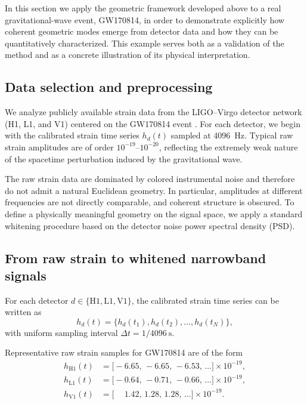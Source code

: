 \documentclass[11pt,a4paper]{article}
\begin{document}
In this section we apply the geometric framework developed above to a real gravitational-wave event, GW170814, in order to demonstrate explicitly how coherent geometric modes emerge from detector data and how they can be quantitatively characterized.
This example serves both as a validation of the method and as a concrete illustration of its physical interpretation.

\subsection{Data selection and preprocessing}

We analyze publicly available strain data from the LIGO--Virgo detector network (H1, L1, and V1) centered on the GW170814 event \cite{Abbott2017GW170814, Abbott2023OpenDataO3}.
For each detector, we begin with the calibrated strain time series $h_d(t)$ sampled at 4096~Hz.
Typical raw strain amplitudes are of order $10^{-19}$--$10^{-20}$, reflecting the extremely weak nature of the spacetime perturbation induced by the gravitational wave.

The raw strain data are dominated by colored instrumental noise and therefore do not admit a natural Euclidean geometry.
In particular, amplitudes at different frequencies are not directly comparable, and coherent structure is obscured.
To define a physically meaningful geometry on the signal space, we apply a standard whitening procedure based on the detector noise power spectral density (PSD).

\subsection{From raw strain to whitened narrowband signals}

For each detector $d \in \{\mathrm{H1}, \mathrm{L1}, \mathrm{V1}\}$, the calibrated strain time series can be written as
\begin{equation}
h_d(t) = \{ h_d(t_1), h_d(t_2), \dots, h_d(t_N) \},
\end{equation}
with uniform sampling interval $\Delta t = 1/4096~\mathrm{s}$.

Representative raw strain samples for GW170814 are of the form
\begin{align}
h_{\mathrm{H1}}(t) &=
\bigl[
-6.65,\,-6.65,\,-6.53,\,\dots
\bigr]\times 10^{-19}, \\
h_{\mathrm{L1}}(t) &=
\bigl[
-0.64,\,-0.71,\,-0.66,\,\dots
\bigr]\times 10^{-19}, \\
h_{\mathrm{V1}}(t) &=
\bigl[
\phantom{-}1.42,\,1.28,\,1.28,\,\dots
\bigr]\times 10^{-19}.
\end{align}
\end{document}
